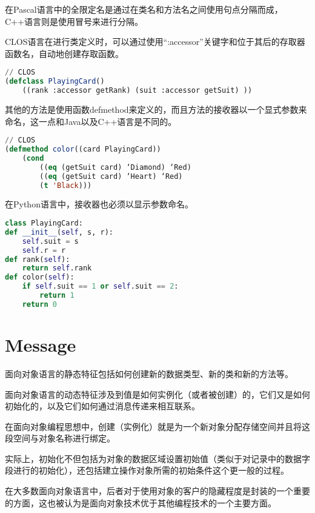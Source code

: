在Pascal语言中的全限定名是通过在类名和方法名之间使用句点分隔而成，C++语言则是使用冒号来进行分隔。

CLOS语言在进行类定义时，可以通过使用“:accessor”关键字和位于其后的存取器函数名，自动地创建存取函数。


\begin{lstlisting}[language=Lisp]
// CLOS
(defclass PlayingCard()
	((rank :accessor getRank) (suit :accessor getSuit) ))
\end{lstlisting}

其他的方法是使用函数defmethod来定义的，而且方法的接收器以一个显式参数来命名，这一点和Java以及C++语言是不同的。





\begin{lstlisting}[language=Lisp]
// CLOS
(defmethod color((card PlayingCard))
	(cond
		((eq (getSuit card) ‘Diamond) ‘Red)
		((eq (getSuit card) ‘Heart) ‘Red)
		(t 'Black)))
\end{lstlisting}

在Python语言中，接收器也必须以显示参数命名。




\begin{lstlisting}[language=Python]
class PlayingCard:
def __init__(self, s, r):
	self.suit = s
	self.r = r
def rank(self):
	return self.rank
def color(self):
	if self.suit == 1 or self.suit == 2:
		return 1
	return 0
\end{lstlisting}


\section{Message}


\begin{compactitem}
\item 面向对象语言的静态特征包括如何创建新的数据类型、新的类和新的方法等。
\item 面向对象语言的动态特征涉及到值是如何实例化（或者被创建）的，它们又是如何初始化的，以及它们如何通过消息传递来相互联系。
\end{compactitem}

在面向对象编程思想中，创建（实例化）就是为一个新对象分配存储空间并且将这段空间与对象名称进行绑定。

实际上，初始化不但包括为对象的数据区域设置初始值（类似于对记录中的数据字段进行的初始化），还包括建立操作对象所需的初始条件这个更一般的过程。

在大多数面向对象语言中，后者对于使用对象的客户的隐藏程度是封装的一个重要的方面，这也被认为是面向对象技术优于其他编程技术的一个主要方面。

